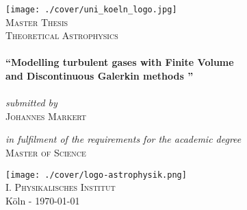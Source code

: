 \newcommand{\expNr}{04}
\newcommand{\expTitle}{}
\newcommand{\releaseDate}{\today}

\begin{titlepage}
\begin{center}

\texttt{[image: ./cover/uni\_koeln\_logo.jpg]}\\[1.0cm]  

\textsc{\LARGE Master Thesis}
\textsc{\Large }\\[0.8cm]
\textsc{\Large Theoretical Astrophysics}\\[0.5cm]

\HRule\\[0.7cm]
{ \LARGE \bfseries \textquotedblleft Modelling turbulent gases with Finite Volume \\[0.4cm] and Discontinuous Galerkin methods \textquotedblright}\\[0.6cm]
\HRule \\[0.7cm]

\vspace{1cm}
\large \emph{submitted by}\\[0.4cm]
\textsc{\LARGE Johannes Markert}\\[1cm]
\vspace{0.2cm}

\large \emph{in fulfilment of the requirements for the academic degree}\\[0.4cm]
\textsc{\LARGE Master of Science}
\vspace{2.0cm}

\texttt{[image: ./cover/logo-astrophysik.png]}\\
\textsc{\large I. Physikalisches Institut}\\[1cm]

\vfill
K\"oln - \releaseDate 

\end{center}
\end{titlepage}


\cleardoubleemptypage
